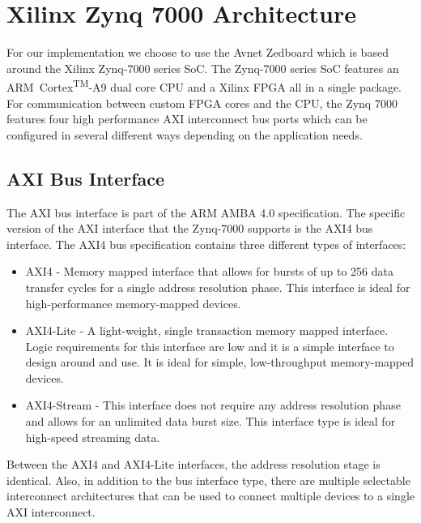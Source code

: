 \documentclass[journal]{IEEEtran}
\begin{document}
\section{Xilinx Zynq 7000 Architecture}
For our implementation we choose to use the Avnet Zedboard which is based around the Xilinx Zynq-7000 series SoC. The Zynq-7000 series SoC features an ARM\textregistered\ Cortex\textsuperscript{TM}-A9 dual core CPU and a Xilinx FPGA all in a single package. For communication between custom FPGA cores and the CPU, the Zynq 7000 features four high performance AXI interconnect bus ports which can be configured in several different ways depending on the application needs. \cite{Zynq-7000_Manual}




\subsection{AXI Bus Interface}
The AXI bus interface is part of the ARM AMBA 4.0 specification. The specific version of the AXI interface that the Zynq-7000 supports is the AXI4 bus interface. The AXI4 bus specification contains three different types of interfaces: \\

	\begin{itemize}
		
		\item AXI4 - Memory mapped interface that allows for bursts of up to 256 data transfer cycles for a single address resolution phase. This interface is ideal for high-performance memory-mapped devices.
		
		\item AXI4-Lite - A light-weight, single transaction memory mapped interface. Logic requirements for this interface are low and it is a simple interface to design around and use. It is ideal for simple, low-throughput memory-mapped devices.
		
		\item AXI4-Stream - This interface does not require any address resolution phase and allows for an unlimited data burst size. This interface type is ideal for high-speed streaming data. \\
		
	\end{itemize}

Between the AXI4 and AXI4-Lite interfaces, the address resolution stage is identical. Also, in addition to the bus interface type, there are multiple selectable interconnect architectures that can be used to connect multiple devices to a single AXI interconnect. 
\end{document}
